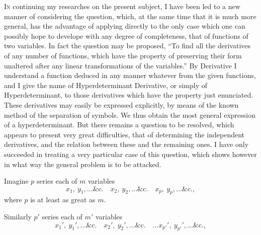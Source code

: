\documentclass[11pt,a4paper]{article}
\theoremstyle{plain}
\theoremstyle{definition}
\theoremstyle{remark}
\begin{document}
\vspace{6pt}

\textsc{In} continuing my researches on the present subject, I have been led to a new
manner of considering the question, which, at the same time that it is much more
general, has the advantage of applying directly to the only case which one can
possibly hope to develope with any degree of completeness, that of functions of two
variables. In fact the question may be proposed, ``To find all the derivatives of any
number of functions, which have the property of preserving their form unaltered after
any linear transformations of the variables.'' By Derivative I understand a function
deduced in any manner whatever from the given functions, and I give the name of
Hyperdeterminant Derivative, or simply of Hyperdeterminant, to those derivatives which
have the property just enunciated. These derivatives may easily be expressed explicitly,
by means of the known method of the separation of symbols. We thus obtain the
most general expression of a hyperdeterminant. But there remains a question to be
resolved, which appears to present very great difficulties, that of determining the
independent derivatives, and the relation between these and the remaining ones. I
have only succeeded in treating a very particular case of this question, which shows
however in what way the general problem is to be attacked.

Imagine $p$ series each of $m$ variables
\[
x_1,\ y_1,\ldots\&\text{c.}\quad x_2,\ y_2,\ldots\&\text{c.}\quad x_p,\ y_p,\ldots\&\text{c.},
\]
where $p$ is at least as great as $m$.

Similarly $p'$ series each of $m'$ variables
\[
x_1',\ y_1',\ldots\&\text{c.}\quad x_2',\ y_2',\ldots\&\text{c.}\quad \ldots x_{p'}',\ y_{p'}',\ldots\&\text{c.},
\]

\newpage
\end{document}
